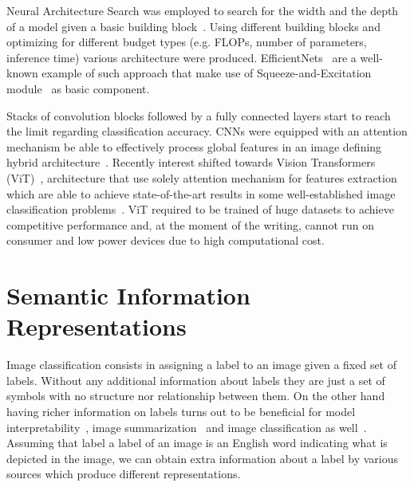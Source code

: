Neural Architecture Search was employed to search for the width and the depth
of a model given a basic building block~\cite{ProgressiveNeuLiuC2017,
GeneticCnnXieL2017, LargeScaleEvoReal2017, RegularizedEvoReal2018}. Using
different building blocks and optimizing for different budget types (e.g.
FLOPs, number of parameters, inference time) various architecture were
produced. EfficientNets~\cite{EfficientnetRTanM2019, Efficientnetv2TanM2021}
are a well-known example of such approach that make use of
Squeeze-and-Excitation module~\cite{SqueezeAndExcHuJi2017} as basic component.

Stacks of convolution blocks followed by a fully connected layers start to
reach the limit regarding classification accuracy. CNNs were equipped with an
attention mechanism be able to effectively process global features in an image
defining hybrid architecture~\cite{SpatialTransfoJaderb2015,
LookAndThinkCaoC2015, ShowAttendAnXuKe2015, ScaCnnSpatiaChen2016}. Recently
interest shifted towards Vision Transformers
(ViT)~\cite{AnImageIsWorDosovi2020}, architecture that use solely attention
mechanism for features extraction which are able to achieve state-of-the-art
results in some well-established image classification
problems~\cite{TransformersInKhan2021, ASurveyOnVisHanK2023}. ViT required to
be trained of huge datasets to achieve competitive performance and, at the
moment of the writing, cannot run on consumer and low power devices due to high
computational cost.

\section{Semantic Information Representations}
\label{sec:semantic-information-sources}
Image classification consists in assigning a label to an image given a fixed
set of labels. Without any additional information about labels they are just a
set of symbols with no structure nor relationship between them. On the other
hand having richer information on labels turns out to be beneficial for model
interpretability~\cite{ImprovingInterDong2017}, image
summarization~\cite{SemanticImagePasini2022} and image classification as
well~\cite{MakingBetterMBertin2019}. Assuming that label a label of an image is
an English word indicating what is depicted in the image, we can obtain extra
information about a label by various sources which produce different representations.

